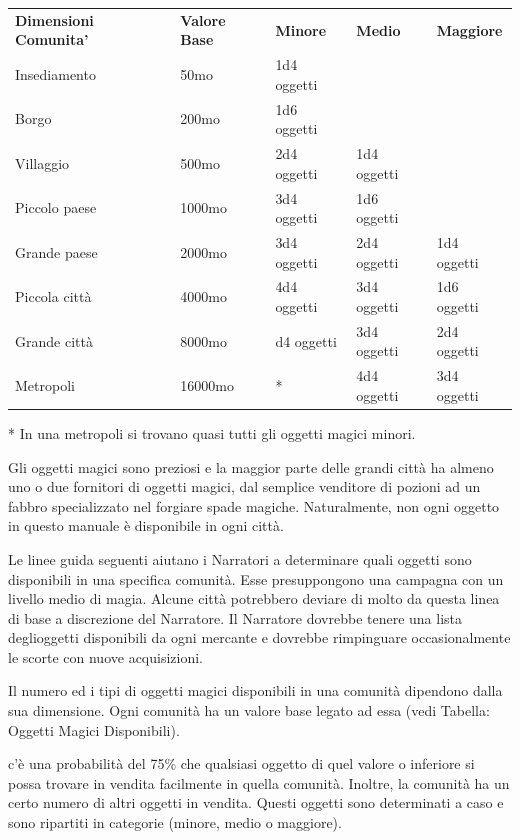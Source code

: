 \documentclass[a4paper,11pt,twoside,openany]{book}
\begin{document}
\begin{tabular}{lllll}
	\toprule
	\textbf{Dimensioni Comunita'} & \textbf{Valore Base} & \textbf{Minore} & \textbf{Medio} & \textbf{Maggiore}\\
	Insediamento  & 50mo & 1d4 oggetti     && \\
	Borgo         & 200mo& 1d6 oggetti     && \\
	Villaggio     & 500mo& 2d4 oggetti     & 1d4 oggetti    & \\
	Piccolo paese & 1000mo               & 3d4 oggetti     & 1d6 oggetti    & \\
	Grande paese  & 2000mo               & 3d4 oggetti     & 2d4 oggetti    & 1d4 oggetti\\
	Piccola città & 4000mo               & 4d4 oggetti     & 3d4 oggetti    & 1d6 oggetti\\
	Grande città  & 8000mo               & d4 oggetti      & 3d4 oggetti    & 2d4 oggetti\\
	Metropoli     & 16000mo              & {*}             & 4d4 oggetti    & 3d4 oggetti\\
\end{tabular}

{*} In una metropoli si trovano quasi tutti gli oggetti magici minori.

\bigskip

Gli oggetti magici sono preziosi e la maggior parte delle grandi città ha almeno uno o due fornitori di oggetti magici, dal semplice venditore di pozioni ad un fabbro specializzato nel forgiare spade magiche. Naturalmente, non ogni oggetto in questo manuale è disponibile in ogni città.

Le linee guida seguenti aiutano i Narratori a determinare quali oggetti sono disponibili in una specifica comunità. Esse presuppongono una campagna con un livello medio di magia. Alcune città potrebbero deviare di molto da questa linea di base a discrezione del Narratore. Il Narratore dovrebbe tenere una lista deglioggetti disponibili da ogni mercante e dovrebbe rimpinguare occasionalmente le scorte con nuove acquisizioni.

Il numero ed i tipi di oggetti magici disponibili in una comunità dipendono dalla sua dimensione. Ogni comunità ha un valore base legato ad essa (vedi Tabella: Oggetti Magici Disponibili).

c'è una probabilità del 75\% che qualsiasi oggetto di quel valore o inferiore si possa trovare in vendita facilmente in quella comunità. Inoltre, la comunità ha un certo numero di altri oggetti in vendita. Questi oggetti sono determinati a caso e sono ripartiti in categorie (minore, medio o maggiore).
\end{document}

